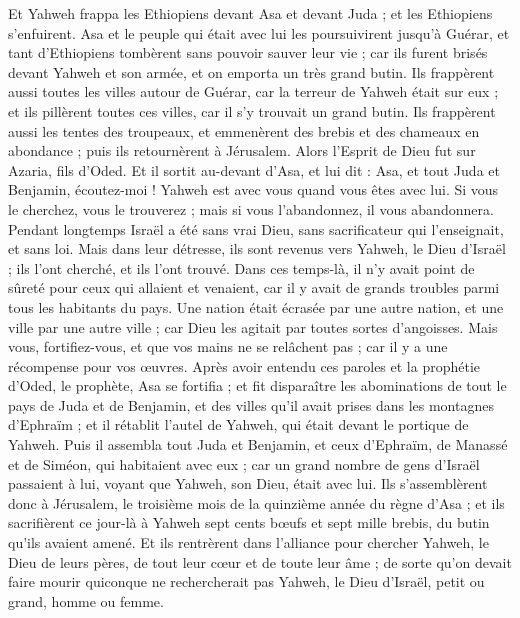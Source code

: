 \begin{multicols}{2}
Et Yahweh frappa les Ethiopiens devant Asa et devant Juda ; et les Ethiopiens s'enfuirent.
Asa et le peuple qui était avec lui les poursuivirent jusqu'à Guérar, et tant d'Ethiopiens tombèrent sans pouvoir sauver leur vie ; car ils furent brisés devant Yahweh et son armée, et on emporta un très grand butin.
Ils frappèrent aussi toutes les villes autour de Guérar, car la terreur de Yahweh était sur eux ; et ils pillèrent toutes ces villes, car il s'y trouvait un grand butin.
Ils frappèrent aussi les tentes des troupeaux, et emmenèrent des brebis et des chameaux en abondance ; puis ils retournèrent à Jérusalem.
\VerseOne{}Alors l'Esprit de Dieu fut sur Azaria, fils d'Oded.
Et il sortit au-devant d'Asa, et lui dit : Asa, et tout Juda et Benjamin, écoutez-moi ! Yahweh est avec vous quand vous êtes avec lui. Si vous le cherchez, vous le trouverez ; mais si vous l'abandonnez, il vous abandonnera.
Pendant longtemps Israël a été sans vrai Dieu, sans sacrificateur qui l’enseignait, et sans loi.
Mais dans leur détresse, ils sont revenus vers Yahweh, le Dieu d'Israël ; ils l’ont cherché, et ils l’ont trouvé.
Dans ces temps-là, il n'y avait point de sûreté pour ceux qui allaient et venaient, car il y avait de grands troubles parmi tous les habitants du pays.
Une nation était écrasée par une autre nation, et une ville par une autre ville ; car Dieu les agitait par toutes sortes d'angoisses.
Mais vous, fortifiez-vous, et que vos mains ne se relâchent pas ; car il y a une récompense pour vos œuvres.
Après avoir entendu ces paroles et la prophétie d'Oded, le prophète, Asa se fortifia ; et fit disparaître les abominations de tout le pays de Juda et de Benjamin, et des villes qu'il avait prises dans les montagnes d'Ephraïm ; et il rétablit l'autel de Yahweh, qui était devant le portique de Yahweh.
Puis il assembla tout Juda et Benjamin, et ceux d'Ephraïm, de Manassé et de Siméon, qui habitaient avec eux ; car un grand nombre de gens d'Israël passaient à lui, voyant que Yahweh, son Dieu, était avec lui.
Ils s'assemblèrent donc à Jérusalem, le troisième mois de la quinzième année du règne d'Asa ;
et ils sacrifièrent ce jour-là à Yahweh sept cents bœufs et sept mille brebis, du butin qu'ils avaient amené.
Et ils rentrèrent dans l'alliance pour chercher Yahweh, le Dieu de leurs pères, de tout leur cœur et de toute leur âme ;
de sorte qu'on devait faire mourir quiconque  ne rechercherait pas Yahweh, le Dieu d'Israël, petit ou grand, homme ou femme.

\end{multicols}
